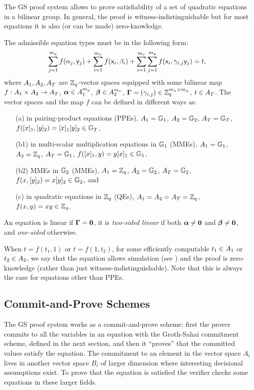 The GS proof system allows to prove satisfiability of a set of quadratic equations in a bilinear group. In general, the proof is witness-indistinguishable but for most equations it is also (or can be made) zero-knowledge.

The admissible equation types must be in the following form:
\begin{equation}\label{gseq}
\sum_{j=1}^{m_y} f(\alpha_j, \mathsf{y}_j)+\sum_{i=1}^{m_x} f(\mathsf{x}_i, \beta_i)+\sum_{i=1}^{m_x} \sum_{j=1}^{m_y}  f(\mathsf{x}_i,\gamma_{i,j} \mathsf{y}_j)=t,
\end{equation}
 where $A_1,A_2,A_T$ are $\mathbb{Z}_q$-vector spaces equipped with some bilinear map $f:A_1\times A_2 \rightarrow A_T$, $\boldsymbol \alpha  \in A_1^{m_y}$, $\boldsymbol \beta  \in A_2^{m_x}$, $\mathbf{{\Gamma}}=(\gamma_{i,j}) \in \mathbb{Z}_q^{m_x\times m_y}$, $t \in A_T$. The vector spaces and the map $f$ can be defined in different ways as:
\begin{itemize}
\item[(a)] in pairing-product equations (PPEs), $A_1=\mathbb{G}_1$, $A_2=\mathbb{G}_2$, $A_T=\mathbb{G}_T$, $f([x]_1,[y]_2)=[x]_1 [y]_2 \in \mathbb{G}_T$,
\item[(b1)] in multi-scalar multiplication equations in $\mathbb{G}_1$ (MMEs), $A_1=\mathbb{G}_1$, $A_2=\mathbb{Z}_q$, $A_T=\mathbb{G}_1$, $f([x]_1,y)=y [x]_1 \in \mathbb{G}_1$,
\item[(b2)] MMEs in $\mathbb{G}_2$ (MMEs),  $A_1=\mathbb{Z}_q$, $A_2=\mathbb{G}_2$, $A_T=\mathbb{G}_2$, $f(x,[y]_2)=x [y]_2 \in \mathbb{G}_2$, and
\item[(c)] in quadratic equations in $\mathbb{Z}_q$ (QEs), $A_1=A_2=A_T=\mathbb{Z}_q$, $f(x,y)=xy \in \mathbb{Z}_q$.
\end{itemize} 
 An equation is linear if $\mathbf{{\Gamma}}=\mathbf{0}$, 
 it is \textit{two-sided linear} if both $\boldsymbol \alpha \neq \mathbf{0}$ and $\boldsymbol \beta \neq \mathbf{0}$, and \textit{one-sided} otherwise.

When $t=f(t_1,1)$ or $t=f(1,t_2)$, for some efficiently computable $t_1\in A_1$ or $t_2\in A_2$, we say that the equation allows simulation (see \cite[Section~11]{SIAMJC:GroSah12}) and the proof is zero-knowledge (rather than just witness-indistinguishable). Note that this is always the case for equations other than PPEs.

\subsection{Commit-and-Prove Schemes} The GS proof system works as a commit-and-prove scheme: first the prover commits to 
all the variables in an equation with the {Groth-Sahai commitment scheme}, defined in the next section, and then it ``proves'' that the committed values satisfy the equation. The commitment to an element in the vector space $A_i$ lives in another vector space $B_i$ of larger dimension where interesting decisional assumptions exist. To prove that the equation is satisfied the verifier checks some equations in these larger fields.

